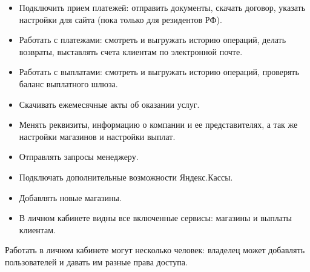 \begin{itemize}
  \item Подключить прием платежей: отправить документы, скачать договор, указать настройки для сайта (пока только для резидентов РФ).
  \item Работать с платежами: смотреть и выгружать историю операций, делать возвраты, выставлять счета клиентам по электронной почте.
  \item Работать с выплатами: смотреть и выгружать историю операций, проверять баланс выплатного шлюза.
  \item Скачивать ежемесячные акты об оказании услуг.
  \item Менять реквизиты, информацию о компании и ее представителях, а так же настройки магазинов и настройки выплат.
  \item Отправлять запросы менеджеру.
  \item Подключать дополнительные возможности Яндекс.Кассы.
  \item Добавлять новые магазины.
  \item В личном кабинете видны все включенные сервисы: магазины и выплаты клиентам.
\end{itemize}

Работать в личном кабинете могут несколько человек: владелец может добавлять пользователей и давать им разные права доступа.

